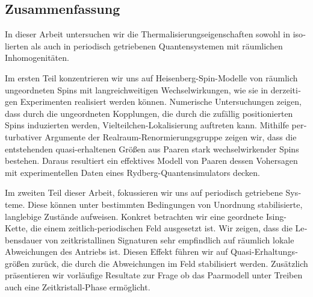 \vfill
\begin{otherlanguage}{ngerman}
\chapter*{Zusammenfassung}

In dieser Arbeit untersuchen wir die Thermalisierungseigenschaften sowohl in isolierten als auch in periodisch getriebenen Quantensystemen mit räumlichen Inhomogenitäten.

Im ersten Teil konzentrieren wir uns auf Heisenberg-Spin-Modelle von räumlich ungeordneten Spins mit langreichweitigen Wechselwirkungen, wie sie in derzeitigen Experimenten realisiert werden können. Numerische Untersuchungen zeigen, dass durch die ungeordneten Kopplungen, die durch die zufällig positionierten Spins induzierten werden, Vielteilchen-Lokalisierung auftreten kann. Mithilfe perturbativer Argumente der Realraum-Renormierungsgruppe zeigen wir, dass die entstehenden quasi-erhaltenen Größen aus Paaren stark wechselwirkender Spins bestehen. Daraus resultiert ein effektives Modell von Paaren dessen Vohersagen mit experimentellen Daten eines Rydberg-Quantensimulators decken.

Im zweiten Teil dieser Arbeit, fokussieren wir uns auf periodisch getriebene Systeme. Diese können unter bestimmten Bedingungen von Unordnung stabilisierte, langlebige Zustände aufweisen. Konkret betrachten wir eine geordnete Ising-Kette, die einem zeitlich-periodischen Feld ausgesetzt ist. Wir zeigen, dass die Lebensdauer von zeitkristallinen Signaturen sehr empfindlich auf räumlich lokale Abweichungen des Antriebs ist. Diesen Effekt führen wir auf Quasi-Erhaltungsgrößen zurück, die durch die Abweichungen im Feld stabilisiert werden. Zusätzlich präsentieren wir vorläufige Resultate zur Frage ob das Paarmodell unter Treiben auch eine Zeitkristall-Phase ermöglicht.
\end{otherlanguage}

\endgroup

\vfill

\color{black}